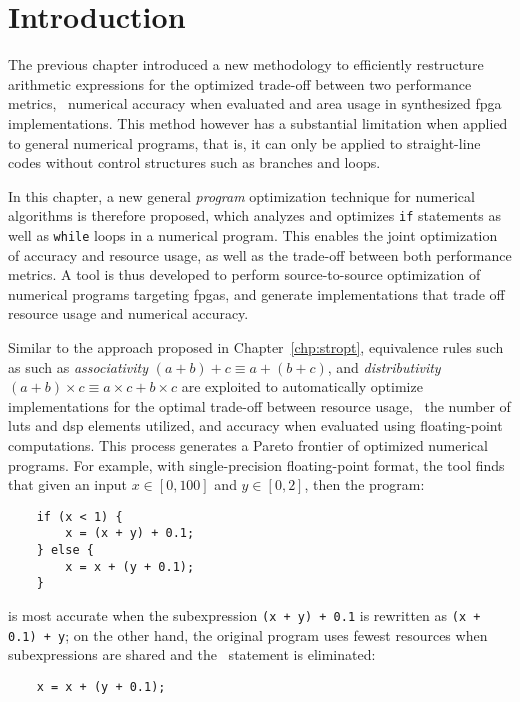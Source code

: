 \section{Introduction}
\label{po:sec:introduction}

The previous chapter introduced a new methodology to efficiently restructure
arithmetic expressions for the optimized trade-off between two performance
metrics, \ie~numerical accuracy when evaluated and area usage in synthesized
\gls{fpga} implementations.  This method however has a substantial limitation
when applied to general numerical programs, that is, it can only be applied to
straight-line codes without control structures such as branches and loops.

In this chapter, a new general \emph{program} optimization technique for
numerical algorithms is therefore proposed, which analyzes and optimizes
\texttt{if} statements as well as \texttt{while} loops in a numerical program.
This enables the joint optimization of accuracy and resource usage, as well
as the trade-off between both performance metrics.  A tool is thus developed
to perform source-to-source optimization of numerical programs targeting
\glspl{fpga}, and generate implementations that trade off resource usage and
numerical accuracy.


Similar to the approach proposed in Chapter~\ref{chp:stropt}, equivalence rules
such as such as \emph{associativity} $(a + b) + c \equiv a + (b + c)$, and
\emph{distributivity} $(a + b) \times c \equiv a \times c + b \times c$ are
exploited to automatically optimize implementations for the optimal trade-off
between resource usage, \ie~the number of \glspl{lut} and \gls{dsp} elements
utilized, and accuracy when evaluated using floating-point computations.  This
process generates a Pareto frontier of optimized numerical programs.  For
example, with single-precision floating-point format, the tool finds that given
an input $x \in [0, 100]$ and $y \in [0, 2]$, then the program:
\begin{lstlisting}
    if (x < 1) {
        x = (x + y) + 0.1;
    } else {
        x = x + (y + 0.1);
    }
\end{lstlisting}
is most accurate when the subexpression \verb|(x + y) + 0.1| is rewritten
as \verb|(x + 0.1) + y|; on the other hand, the original program uses
fewest resources when subexpressions are shared and the \iflit~statement is
eliminated:
\begin{lstlisting}
    x = x + (y + 0.1);
\end{lstlisting}

